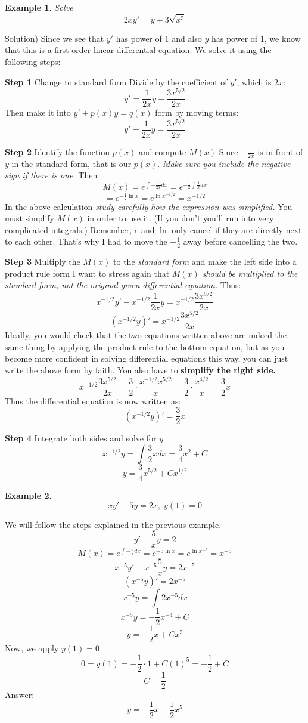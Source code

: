 \documentclass[12pt]{report}
\newtheorem{ex}{Example}[section]
\begin{document}
\begin{ex} Solve
$$2xy' = y+ 3\sqrt{x^5} $$
\end{ex}
Solution) Since we see that $y'$ has power of 1 and also $y$ has power of 1, we know that this is a first order linear differential equation. We solve it using the following steps:

\textbf{Step 1} Change to standard form
Divide by the coefficient of $y'$, which is $2x$:
$$y'= \frac{1}{2x} y + \frac{3 x^{5/2}}{2x} $$
Then make it into $y'+p(x) y = q(x)$ form by moving terms:
$$y'- \frac{1}{2x} y = \frac{3 x^{5/2}}{2x} $$

\textbf{Step 2} Identify the function $p(x)$ and compute $M(x)$
Since $- \frac{1}{2x}$ is in front of $y$ in the standard form, that is our $p(x)$. \textit{Make sure you include the negative sign if there is one.} Then
$$M(x) = e^{\int -\frac{1}{2x} dx} = e^{-\frac{1}{2} \int \frac{1}{x} dx}$$
$$= e^{-\frac{1}{2} \ln x } = e^{\ln x^{-1/2}} = x^{-1/2}$$
In the above calculation \textit{study carefully how the expression was simplified. } You must simplify $M(x)$ in order to use it. (If you don't you'll run into very complicated integrals.) Remember, $e$ and $\ln$ only cancel if they are directly next to each other. That's why I had to move the $-\frac{1}{2}$ away before cancelling the two.

\textbf{Step 3} Multiply the $M(x)$ to the \textit{standard form} and make the left side into a product rule form
I want to stress again that $M(x)$ \textit{should be multiplied to the standard form, not the original given differential equation.} Thus:
$$ x^{-1/2}y'- x^{-1/2}\frac{1}{2x} y = x^{-1/2}\frac{3 x^{5/2}}{2x} $$
$$ \left(x^{-1/2}y\right)' = x^{-1/2}\frac{3 x^{5/2}}{2x} $$
Ideally, you would check that the two equations written above are indeed the same thing by applying the product rule to the bottom equation, but as you become more confident in solving differential equations this way, you can just write the above form by faith. You also have to \textbf{simplify the right side. }
$$x^{-1/2}\frac{3 x^{5/2}}{2x} = \frac{3}{2}\cdot \frac{x^{-1/2} x^{5/2}}{x}= \frac{3}{2}\cdot \frac{x^{4/2}}{x}=\frac{3}{2}x$$
Thus the differential equation is now written as:
$$ \left(x^{-1/2}y\right)' = \frac{3}{2}x$$

\textbf{Step 4} Integrate both sides and solve for $y$
$$ x^{-1/2}y = \int \frac{3}{2}x dx = \frac{3}{4}x^2 +C $$
$$ y = \frac{3}{4}x^{5/2} +C x^{1/2} $$

\begin{ex}
$$ xy'-5y = 2x, \; y(1)=0$$
\end{ex}
We will follow the steps explained in the previous example.
$$ y'-\frac{5}{x} y = 2 $$
$$M(x) = e^ {\int -\frac{5}{x} dx} = e^{-5 \ln x} = e^{\ln x^{-5}}=x^{-5}$$
$$ x^{-5}y'-x^{-5}\frac{5}{x} y = 2x^{-5} $$
$$ \left(x^{-5}y\right)' = 2x^{-5} $$
$$ x^{-5}y = \int 2x^{-5} dx $$
$$ x^{-5}y = -\frac{1}{2} x^{-4} +C $$
$$ y = -\frac{1}{2} x +Cx^{5}$$
Now, we apply $y(1)=0$
$$ 0=y(1) = -\frac{1}{2} \cdot 1 +C (1)^{5}= -\frac{1}{2}+C$$
$$C = \frac{1}{2}$$
Answer:
$$ y = -\frac{1}{2} x + \frac{1}{2} x^{5}$$
\end{document}
